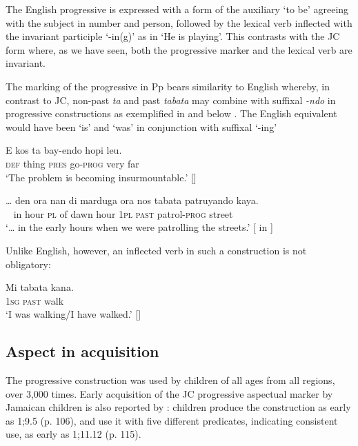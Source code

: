 \documentclass[output=paper,colorlinks,citecolor=brown]{langscibook}
\begin{document}
The English progressive is expressed with a form of the auxiliary ‘to be’ agreeing with the subject in number and person, followed by the lexical verb inflected with the invariant participle ‘-in(g)’ as in ‘He is playing’. This contrasts with the JC form where, as we have seen, both the progressive marker and the lexical verb are invariant.


The marking of the progressive in Pp bears similarity to English whereby, in contrast to JC, non-past \textit{ta} and past \textit{tabata} may combine with suffixal \textit{{}-ndo} in progressive constructions as exemplified in  and  below \citep[310]{KouwenbergRamos2007}. The English equivalent would have been ‘is’ and ‘was’ in conjunction with suffixal ‘-ing’


\ea \label{bkm:messamK:22}
\gll  E     kos    ta      bay-endo  hopi leu. \\
\textsc{def} thing  \textsc{pres} go-\textsc{prog} very far\\
\glt `The problem is becoming insurmountable.’        [\citet[310]{KouwenbergRamos2007}]
\z




\ea \label{bkm:messamK:23}
\gll  … den ora  nan di marduga ora   nos  tabata patruyando  kaya.\\
      ~ in   hour \textsc{pl}   of dawn       hour 1\textsc{pl} \textsc{past}    patrol-\textsc{prog} street\\
\glt `… in the early hours when we were patrolling the streets.’
 [\citet[406]{Maurer1988} in \citet[311]{KouwenbergRamos2007}]
\z




{Unlike English, however, an inflected verb in such a construction is not obligatory:}

\ea \label{bkm:messamK:24}
\gll  Mi   tabata kana.\\
        1\textsc{sg}  \textsc{past}   walk\\
\glt `I was walking/I have walked.’
[\citealt[61]{KouwenbergLefebvre2007}]
\z


\subsection{Aspect in acquisition} \label{sec:messamk:5.2}

The progressive construction was used by children of all ages from all regions, over 3,000 times. Early acquisition of the JC progressive aspectual marker by Jamaican children is also reported by \citet{DeLisser2015}: children produce the construction as early as 1;9.5 (p. 106), and use it with five different predicates, indicating consistent use, as early as 1;11.12 (p. 115).
\end{document}
